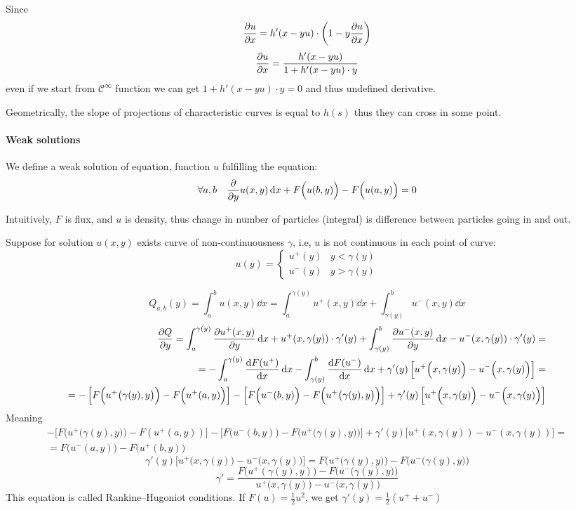 Since
$$\pdv{u}{x} = h'(x-yu) \cdot \left(1 - y\pdv{u}{x} \right)$$
$$\pdv{u}{x} = \frac{h'(x-yu)}{1+h'(x-yu) \cdot y} $$
even if we start from $\mathcal{C}^\infty$ function we can get $1+h'(x-yu) \cdot y = 0$ and thus undefined derivative.

Geometrically, the slope of projections of characteristic curves is equal to $h(s)$ thus they can cross in some point.

\paragraph{Weak solutions}
We define a weak solution of equation, function $u$  fulfilling the equation:
$$\forall a,b \quad \pdv{y} u(x,y) \dd{x} + F\Big(u(b,y)\Big)-F\Big(u(a,y)\Big) = 0$$

Intuitively, $F$ is flux, and $u$ is density, thus change in number of particles (integral) is difference between particles going in and out.

Suppose for solution $u(x,y)$ exists curve of non-continuousness $\gamma$, i.e, $u$ is not continuous in each point of curve:
$$u(y) = \begin{cases}
u^+(y) & y < \gamma(y)\\
u^-(y) & y > \gamma(y)
\end{cases}$$

$$Q_{a,b}(y) = \int_a^b u(x,y) \dd{x} = \int_a^{\gamma(y)} u^+(x,y) \dd{x} + \int_{\gamma(y)}^{b} u^-(x,y) \dd{x}$$ 
\begin{align*}
\pdv{Q}{y} = \int_a^{\gamma(y)} \pdv{u^+(x,y)}{y} \dd{x} + u^+(x,\gamma(y)) \cdot \gamma'(y) + \int_{\gamma(y)}^{b} \pdv{u^-(x,y)}{y} \dd{x}-  u^-(x,\gamma(y)) \cdot \gamma'(y) =\\= - \int_{a}^{\gamma(y)}  \dv{F(u^+)}{x} \dd{x} - \int_{\gamma(y)}^{b} \dv{F(u^-)}{x} \dd{x} + \gamma'(y) \left[ u^+\Big(x,\gamma(y)\Big) -  u^-\Big(x,\gamma(y)\Big) \right] =\\= -\left[F\Big(u^+\big(\gamma(y),y\big)\Big)-F\Big(u^+(a,y)\Big)\right]-\left[F\Big(u^-(b,y)\Big)-F\Big(u^+\big(\gamma(y),y\big)\Big)\right] + \gamma'(y) \left[ u^+\Big(x,\gamma(y)\Big) -  u^-\Big(x,\gamma(y)\Big)  \right]
\end{align*}
Meaning
\begin{align*}
-\bigg[F\Big(u^+\big(\gamma(y),y\big)\Big)-F(u^+(a,y))\bigg]-\bigg[F\Big(u^-(b,y)\Big)-F\Big(u^+\big(\gamma(y),y\big)\Big)\bigg] + \gamma'(y) \bigg[ u^+(x,\gamma(y)) -  u^-(x,\gamma(y))  \bigg] =\\= F\Big(u^-(a,y)\Big) - F\Big(u^+(b,y)\Big) 
\end{align*}
$$ $$
$$  \gamma'(y) \bigg[ u^+\Big(x,\gamma(y)\Big) -  u^-\Big(x,\gamma(y)\Big)  \bigg] = F\Big(u^+\big(\gamma(y),y\big)\Big) - F\Big(u^-\big(\gamma(y),y\big)\Big)  $$
$$\gamma' = \frac{ F\Big(u^+(\gamma(y),y)\Big) - F\Big(u^-\big(\gamma(y),y\big)\Big)}{u^+\big(x,\gamma(y)\big) -  u^-\big(x,\gamma(y)\big) }$$
This equation is called Rankine–Hugoniot conditions.
If $F(u) = \frac{1}{2}u^2$, we get $\gamma'(y) = \frac{1}{2}\left(u^+ + u^-\right)$

